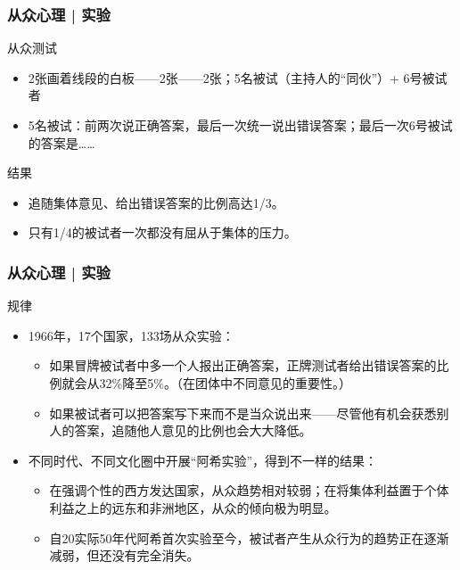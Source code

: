 \begin{frame}
  \frametitle{从众心理 | 实验}
  \begin{block}{从众测试}
    \begin{itemize}
      \item 2张画着线段的白板——2张——2张；5名被试（主持人的“同伙”）+ 6号被试者
      \item 5名被试：前两次说正确答案，最后一次统一说出错误答案；最后一次6号被试的答案是……
    \end{itemize}
  \end{block}
  \pause
  \begin{block}{结果}
    \begin{itemize}
      \item 追随集体意见、给出错误答案的比例高达1/3。
      \item 只有1/4的被试者一次都没有屈从于集体的压力。
    \end{itemize}
  \end{block}
\end{frame}

\begin{frame}
  \frametitle{从众心理 | 实验}
  \begin{block}{规律}
    \begin{itemize}
      \item 1966年，17个国家，133场从众实验：
    \begin{itemize}
      \item 如果冒牌被试者中多一个人报出正确答案，正牌测试者给出错误答案的比例就会从32\%降至5\%。（在团体中不同意见的重要性。）
      \item 如果被试者可以把答案写下来而不是当众说出来——尽管他有机会获悉别人的答案，追随他人意见的比例也会大大降低。
    \end{itemize}
      \item 不同时代、不同文化圈中开展“阿希实验”，得到不一样的结果：
        \begin{itemize}
      \item 在强调个性的西方发达国家，从众趋势相对较弱；在将集体利益置于个体利益之上的远东和非洲地区，从众的倾向极为明显。
      \item 自20实际50年代阿希首次实验至今，被试者产生从众行为的趋势正在逐渐减弱，但还没有完全消失。
        \end{itemize}
    \end{itemize}
  \end{block}
\end{frame}

